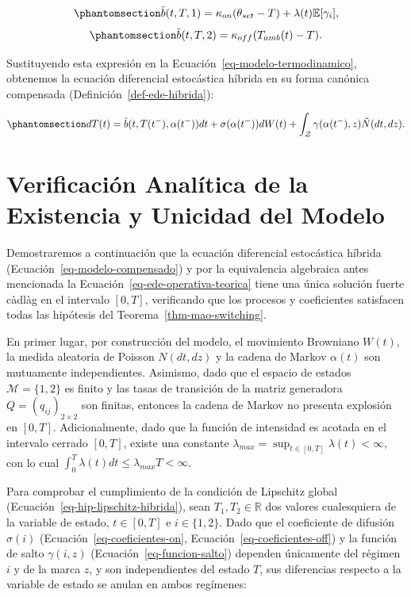 \documentclass[
  spanish,
  us-letterpaper,
]{scrreprt}
\numberwithin{equation}{section}
\theoremstyle{plain}
\theoremstyle{plain}
\theoremstyle{plain}
\theoremstyle{definition}
\theoremstyle{remark}
\begin{document}
\begin{equation}\phantomsection\label{eq-deriva-compensada-on}{
\tilde{b}(t, T, 1) = \kappa_{on}(\theta_{set} - T) + \lambda(t)\mathbb{E}[\gamma_i],
}\end{equation}
\begin{equation}\phantomsection\label{eq-deriva-compensada-off}{
\tilde{b}(t, T, 2) = \kappa_{off}(T_{amb}(t) - T).
}\end{equation}

Sustituyendo esta expresión en la
Ecuación~\ref{eq-modelo-termodinamico}, obtenemos la ecuación
diferencial estocástica híbrida en su forma canónica compensada
(Definición~\ref{def-ede-hibrida}):

\begin{equation}\phantomsection\label{eq-modelo-compensado}{
dT(t) = \tilde{b}(t, T(t^-), \alpha(t^-)) dt + \sigma(\alpha(t^-)) dW(t) + \int_{\mathcal{Z}} \gamma(\alpha(t^-), z) \tilde{N}(dt, dz).
}\end{equation}

\section{Verificación Analítica de la Existencia y Unicidad del
Modelo}\label{sec-verificacion-existencia-unicidad}

Demostraremos a continuación que la ecuación diferencial estocástica
híbrida (Ecuación~\ref{eq-modelo-compensado}) y por la equivalencia
algebraica antes mencionada la Ecuación~\ref{eq-ede-operativa-teorica}
tiene una única solución fuerte càdlàg en el intervalo \([0, T]\),
verificando que los procesos y coeficientes satisfacen todas las
hipótesis del Teorema~\ref{thm-mao-switching}.

En primer lugar, por construcción del modelo, el movimiento Browniano
\(W(t)\), la medida aleatoria de Poisson \(N(dt, dz)\) y la cadena de
Markov \(\alpha(t)\) son mutuamente independientes. Asimismo, dado que
el espacio de estados \(\mathcal{M} = \{1, 2\}\) es finito y las tasas
de transición de la matriz generadora \(Q = (q_{ij})_{2 \times 2}\) son
finitas, entonces la cadena de Markov no presenta explosión en
\([0, T]\). Adicionalmente, dado que la función de intensidad es acotada
en el intervalo cerrado \([0, T]\), existe una constante
\(\displaystyle \lambda_{max} = \sup_{t \in [0, T]} \lambda(t) < \infty\),
con lo cual
\(\displaystyle \int_0^T \lambda(t)dt \le \lambda_{max}T < \infty\).

Para comprobar el cumplimiento de la condición de Lipschitz global
(Ecuación~\ref{eq-hip-lipschitz-hibrida}), sean
\(T_1, T_2 \in \mathbb{R}\) dos valores cualesquiera de la variable de
estado, \(t \in [0, T]\) e \(i \in \{1, 2\}\). Dado que el coeficiente
de difusión \(\sigma(i)\) (Ecuación~\ref{eq-coeficientes-on},
Ecuación~\ref{eq-coeficientes-off}) y la función de salto
\(\gamma(i, z)\) (Ecuación~\ref{eq-funcion-salto}) dependen únicamente
del régimen \(i\) y de la marca \(z\), y son independientes del estado
\(T\), sus diferencias respecto a la variable de estado se anulan en
ambos regímenes:
\end{document}
